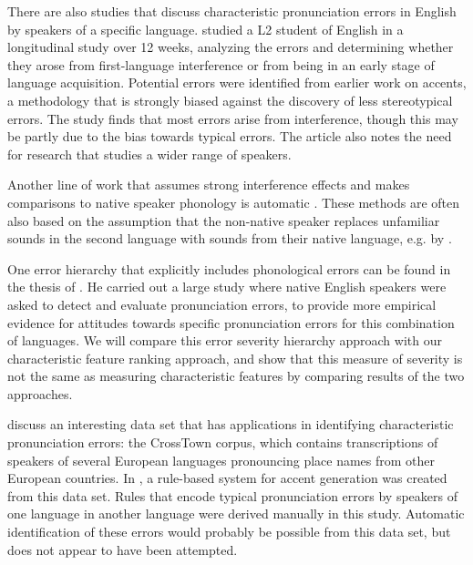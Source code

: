 \documentclass[output=paper]{LSP/langsci}
\begin{document}
There are also studies that discuss characteristic pronunciation errors in English by speakers of a specific language. \citet{gao_pronunciation_2005} studied a  L2 student of English in a longitudinal study over 12 weeks, analyzing the errors and determining whether they arose from first-language interference or from being in an early stage of language acquisition. Potential errors were identified from earlier work on  accents, a methodology that is strongly biased against the discovery of less stereotypical errors. The study finds that most errors arise from  interference, though this may be partly due to the bias towards typical  errors. The article also notes the need for research that studies a wider range of speakers.

Another line of work that assumes strong interference effects and makes comparisons to native speaker phonology is automatic . These methods are often also based on the assumption that the non-native speaker replaces unfamiliar sounds in the second language with sounds from their native language, e.g. by \citet{angkititrakul_advances_2006}.

One error hierarchy that explicitly includes phonological errors can be found in the thesis of \citet{van_den_doel_evaluation_2006}. He carried out a large study where native English speakers were asked to detect and evaluate  pronunciation errors, to provide more empirical evidence for attitudes towards specific pronunciation errors for this combination of languages. We will compare this error severity hierarchy approach with our characteristic feature ranking approach, and show that this measure of severity is not the same as measuring characteristic features by comparing results of the two approaches.

\citet{schaden_casselberveetovallarga_2006} discuss an interesting data set that has applications in identifying characteristic pronunciation errors: the CrossTown corpus, which contains transcriptions of speakers of several European languages pronouncing place names from other European countries. In \citet{schaden_crosstowns_2004}, a rule-based system for accent generation was created from this data set. Rules that encode typical pronunciation errors by speakers of one language in another language were derived manually in this study. Automatic identification of these errors would probably be possible from this data set, but does not appear to have been attempted.
\end{document}
